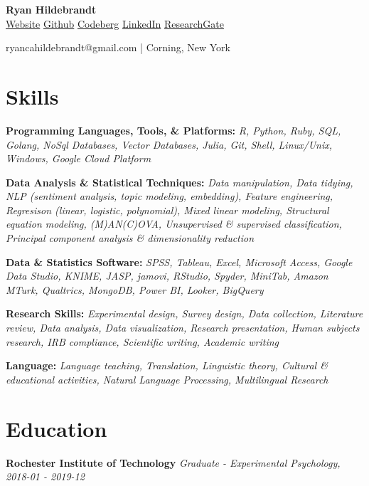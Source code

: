 \documentclass[a4paper,9pt]{extarticle}
\begin{document}
\begin{center}\textbf{\Large  Ryan Hildebrandt}\\[2pt]

\href{https://rcah.xyz}{Website} \href{https://github.com/ryancahildebrandt}{Github} \href{https://codeberg.org/ryancahildebrandt}{Codeberg} \href{https://linkedin.com/in/rcah}{LinkedIn} \href{https://researchgate.net/profile/Ryan-Hildebrandt}{ResearchGate} 

ryancahildebrandt@gmail.com | Corning, New York\end{center}



\section*{Skills}

\noindent
\textbf{Programming Languages, Tools, \& Platforms:}
\textit{R, Python, Ruby, SQL, Golang, NoSql Databases, Vector Databases, Julia, Git, Shell, Linux/Unix, Windows, Google Cloud Platform}

\noindent
\textbf{Data Analysis \& Statistical Techniques:}
\textit{Data manipulation, Data tidying, NLP (sentiment analysis, topic modeling, embedding), Feature engineering, Regresison (linear, logistic, polynomial), Mixed linear modeling, Structural equation modeling, (M)AN(C)OVA, Unsupervised \& supervised classification, Principal component analysis \& dimensionality reduction}

\noindent
\textbf{Data \& Statistics Software:}
\textit{SPSS, Tableau, Excel, Microsoft Access, Google Data Studio, KNIME, JASP, jamovi, RStudio, Spyder, MiniTab, Amazon MTurk, Qualtrics, MongoDB, Power BI, Looker, BigQuery}

\noindent
\textbf{Research Skills:}
\textit{Experimental design, Survey design, Data collection, Literature review, Data analysis, Data visualization, Research presentation, Human subjects research, IRB compliance, Scientific writing, Academic writing}

\noindent
\textbf{Language:}
\textit{Language teaching, Translation, Linguistic theory, Cultural \& educational activities, Natural Language Processing, Multilingual Research}



\section*{Education}

\noindent
\textbf{Rochester Institute of Technology}
\textit{Graduate - Experimental Psychology, 2018-01 - 2019-12}
\end{document}
